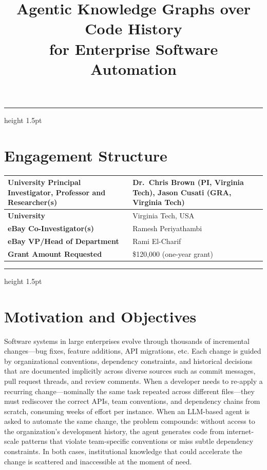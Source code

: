 \documentclass[11pt, letterpaper]{article}
\title{Agentic Knowledge Graphs over Code History\\for Enterprise Software Automation}
\author{}
\date{}
\makeatletter
\renewcommand{\maketitle}{%
  {\parindent0pt\relax
   \fontsize{36}{43}\selectfont\color{ebay-dark}\bfseries\raggedright
   \@title\par}%
  {\color{gray!60}\hrule height 1.5pt\par}%
}
\newcommand{\ehr}{{\color{gray!60}\hrule height 1.5pt}}
\makeatother
\begin{document}
\maketitle

\section*{Engagement Structure}
\label{sec:engagement}

\noindent
\begin{tabularx}{\textwidth}{>{\raggedright\arraybackslash}p{} X}
  \toprule
  \textbf{University Principal Investigator, Professor and Researcher(s)} &
  Dr.~Chris Brown (PI, Virginia Tech), Jason Cusati (GRA, Virginia Tech) \\
  \midrule
  \textbf{University} & Virginia Tech, USA \\
  \midrule
  \textbf{eBay Co-Investigator(s)} & Ramesh Periyathambi \\
  \midrule
  \textbf{eBay VP/Head of Department} & Rami El-Charif \\
  \midrule
  \textbf{Grant Amount Requested} & \$120,000 (one-year grant) \\
  \bottomrule
\end{tabularx}

\ehr

\section*{Motivation and Objectives}
\label{sec:objectives}

Software systems in large enterprises evolve through thousands of incremental changes---bug fixes, feature additions, API migrations, etc. Each change is guided by organizational conventions, dependency constraints, and historical decisions that are documented implicitly across diverse sources such as commit messages, pull request threads, and review comments. When a developer needs to re-apply a recurring change---nominally the same task repeated across different files---they must rediscover the correct APIs, team conventions, and dependency chains from scratch, consuming weeks of effort per instance. When an LLM-based agent is asked to automate the same change, the problem compounds: without access to the organization's development history, the agent generates code from internet-scale patterns that violate team-specific conventions or miss subtle dependency constraints. In both cases, institutional knowledge that could accelerate the change is scattered and inaccessible at the moment of need.
\end{document}
